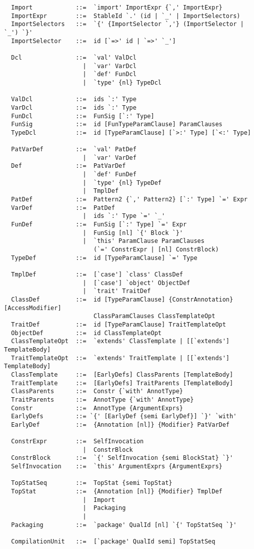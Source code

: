 {\begin{lstlisting}
  Import            ::=  `import' ImportExpr {`,' ImportExpr}
  ImportExpr        ::=  StableId `.' (id | `_' | ImportSelectors)
  ImportSelectors   ::=  `{' {ImportSelector `,'} (ImportSelector | `_') `}'
  ImportSelector    ::=  id [`=>' id | `=>' `_']

  Dcl               ::=  `val' ValDcl
                      |  `var' VarDcl
                      |  `def' FunDcl
                      |  `type' {nl} TypeDcl

  ValDcl            ::=  ids `:' Type
  VarDcl            ::=  ids `:' Type
  FunDcl            ::=  FunSig [`:' Type]
  FunSig            ::=  id [FunTypeParamClause] ParamClauses
  TypeDcl           ::=  id [TypeParamClause] [`>:' Type] [`<:' Type]

  PatVarDef         ::=  `val' PatDef
                      |  `var' VarDef
  Def               ::=  PatVarDef
                      |  `def' FunDef
                      |  `type' {nl} TypeDef
                      |  TmplDef
  PatDef            ::=  Pattern2 {`,' Pattern2} [`:' Type] `=' Expr
  VarDef            ::=  PatDef
                      |  ids `:' Type `=' `_'
  FunDef            ::=  FunSig [`:' Type] `=' Expr
                      |  FunSig [nl] `{' Block `}'
                      |  `this' ParamClause ParamClauses 
                         (`=' ConstrExpr | [nl] ConstrBlock)
  TypeDef           ::=  id [TypeParamClause] `=' Type

  TmplDef           ::=  [`case'] `class' ClassDef
                      |  [`case'] `object' ObjectDef
                      |  `trait' TraitDef
  ClassDef          ::=  id [TypeParamClause] {ConstrAnnotation} [AccessModifier] 
                         ClassParamClauses ClassTemplateOpt 
  TraitDef          ::=  id [TypeParamClause] TraitTemplateOpt
  ObjectDef         ::=  id ClassTemplateOpt
  ClassTemplateOpt  ::=  `extends' ClassTemplate | [[`extends'] TemplateBody]
  TraitTemplateOpt  ::=  `extends' TraitTemplate | [[`extends'] TemplateBody]
  ClassTemplate     ::=  [EarlyDefs] ClassParents [TemplateBody]
  TraitTemplate     ::=  [EarlyDefs] TraitParents [TemplateBody]
  ClassParents      ::=  Constr {`with' AnnotType}
  TraitParents      ::=  AnnotType {`with' AnnotType}
  Constr            ::=  AnnotType {ArgumentExprs}
  EarlyDefs         ::= `{' [EarlyDef {semi EarlyDef}] `}' `with'
  EarlyDef          ::=  {Annotation [nl]} {Modifier} PatVarDef

  ConstrExpr        ::=  SelfInvocation 
                      |  ConstrBlock
  ConstrBlock       ::=  `{' SelfInvocation {semi BlockStat} `}'
  SelfInvocation    ::=  `this' ArgumentExprs {ArgumentExprs}

  TopStatSeq        ::=  TopStat {semi TopStat}
  TopStat           ::=  {Annotation [nl]} {Modifier} TmplDef
                      |  Import
                      |  Packaging
                      |
  Packaging         ::=  `package' QualId [nl] `{' TopStatSeq `}'

  CompilationUnit   ::=  [`package' QualId semi] TopStatSeq
\end{lstlisting}
}

